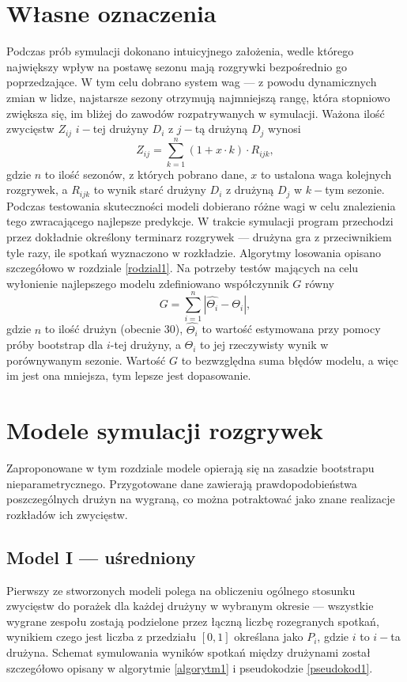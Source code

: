 \documentclass[inzynierska]{pwr_wmat_praca_dyplomowa}
\theoremstyle{plain}
\numberwithin{theorem}{chapter}
\theoremstyle{definition}
\numberwithin{theorem}{chapter}
\begin{document}
\section{Własne oznaczenia} \label{wlasne_oznaczenia}
Podczas prób symulacji dokonano intuicyjnego założenia, wedle którego największy wpływ na postawę sezonu mają rozgrywki bezpośrednio go poprzedzające. W tym celu dobrano system wag --- z powodu dynamicznych zmian w lidze, najstarsze sezony otrzymują najmniejszą rangę, która stopniowo zwiększa się, im bliżej do zawodów rozpatrywanych w symulacji. Ważona ilość zwycięstw $Z_{ij}$ $i-$tej drużyny $D_i$ z $j-$tą drużyną $D_j$ wynosi
\begin{equation}
	Z_{ij} = \sum_{k=1}^{n} (1+x\cdot k)\cdot R_{ijk}, 
\end{equation}
gdzie $n$ to ilość sezonów, z których pobrano dane, $x$ to ustalona waga kolejnych rozgrywek, a $R_{ijk}$ to wynik starć drużyny $D_i$ z drużyną $D_j$ w $k-$tym sezonie. Podczas testowania skuteczności modeli dobierano różne wagi w celu znalezienia tego zwracającego najlepsze predykcje. W trakcie symulacji program przechodzi przez dokładnie określony terminarz rozgrywek --- drużyna gra z przeciwnikiem tyle razy, ile spotkań wyznaczono w rozkładzie. Algorytmy losowania opisano szczegółowo w rozdziale \ref{rodzial1}. 
Na potrzeby testów mających na celu wyłonienie najlepszego modelu zdefiniowano współczynnik $G$ równy
\begin{equation}\label{wskaznik_g}
	G = \sum_{i=1}^{n}|\hat{\Theta_i} - \Theta_i|,
\end{equation}
gdzie $n$ to ilość drużyn (obecnie 30), $\hat{\Theta_i}$ to wartość estymowana przy pomocy próby bootstrap dla $i$-tej drużyny, a $\Theta_i$ to jej rzeczywisty wynik w porównywanym sezonie. Wartość $G$ to bezwzględna suma błędów modelu, a więc im jest ona mniejsza, tym lepsze jest dopasowanie. 

\section{Modele symulacji rozgrywek}
Zaproponowane w tym rozdziale modele opierają się na zasadzie bootstrapu nieparametrycznego. Przygotowane dane zawierają prawdopodobieństwa poszczególnych drużyn na wygraną, co można potraktować jako znane realizacje rozkładów ich zwycięstw.

\subsection{Model I --- uśredniony}
Pierwszy ze stworzonych modeli polega na obliczeniu ogólnego stosunku zwycięstw do porażek dla każdej drużyny w wybranym okresie --- wszystkie wygrane zespołu zostają podzielone przez łączną liczbę rozegranych spotkań, wynikiem czego jest liczba z przedziału $[0,1]$ określana jako $P_{i}$, gdzie $i$ to $i-$ta drużyna. Schemat symulowania wyników spotkań między drużynami został szczegółowo opisany w algorytmie \ref{algorytm1} i pseudokodzie \ref{pseudokod1}.
\end{document}

